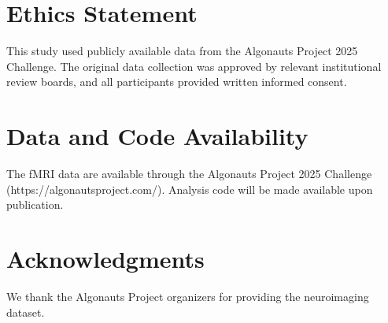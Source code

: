 \documentclass[10pt,letterpaper]{article}
\begin{document}
\section{Ethics Statement}

This study used publicly available data from the Algonauts Project 2025 Challenge. The original data collection was approved by relevant institutional review boards, and all participants provided written informed consent.

\section{Data and Code Availability}

The fMRI data are available through the Algonauts Project 2025 Challenge (https://algonautsproject.com/). Analysis code will be made available upon publication.

\section{Acknowledgments}

We thank the Algonauts Project organizers for providing the neuroimaging dataset.





\end{document}
